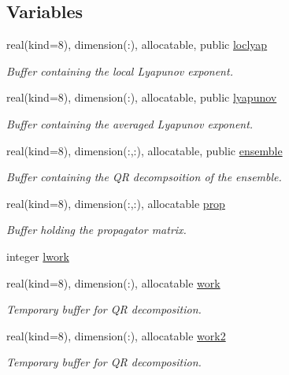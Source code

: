 \subsection*{Variables}
\begin{DoxyCompactItemize}
\item 
real(kind=8), dimension(\+:), allocatable, public \hyperlink{namespacelyap__vectors_a85e15a0071ac9c6857316d72152be731}{loclyap}
\begin{DoxyCompactList}\small\item\em Buffer containing the local Lyapunov exponent. \end{DoxyCompactList}\item 
real(kind=8), dimension(\+:), allocatable, public \hyperlink{namespacelyap__vectors_a9bf23b3cf7aebbfe17422bbd63e95bab}{lyapunov}
\begin{DoxyCompactList}\small\item\em Buffer containing the averaged Lyapunov exponent. \end{DoxyCompactList}\item 
real(kind=8), dimension(\+:,\+:), allocatable, public \hyperlink{namespacelyap__vectors_a23c35fd358f7646818d0637993f0078b}{ensemble}
\begin{DoxyCompactList}\small\item\em Buffer containing the QR decompsoition of the ensemble. \end{DoxyCompactList}\item 
real(kind=8), dimension(\+:,\+:), allocatable \hyperlink{namespacelyap__vectors_a64ed59283a3d1411d14735b924b5794b}{prop}
\begin{DoxyCompactList}\small\item\em Buffer holding the propagator matrix. \end{DoxyCompactList}\item 
integer \hyperlink{namespacelyap__vectors_a217e531a819065ea8ebc1548ca82d5e1}{lwork}
\item 
real(kind=8), dimension(\+:), allocatable \hyperlink{namespacelyap__vectors_ac6e7ade9ca919e7183c90eb20f820ce4}{work}
\begin{DoxyCompactList}\small\item\em Temporary buffer for QR decomposition. \end{DoxyCompactList}\item 
real(kind=8), dimension(\+:), allocatable \hyperlink{namespacelyap__vectors_a1575bc16fe4704466132dea4aeb2d067}{work2}
\begin{DoxyCompactList}\small\item\em Temporary buffer for QR decomposition. \end{DoxyCompactList}\item 

\end{DoxyCompactItemize}
